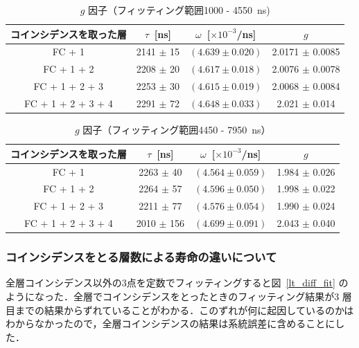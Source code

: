 \begin{table}[H]
\caption{$g$ 因子（フィッティング範囲1000 - 4550~ns) }
\label{fitrange3}
\centering
\begin{tabular}{cccc}\toprule
コインシデンスを取った層 & $\tau$~[ns] & $\omega$~[$\times 10^{-3}$/ns] & $g$ \\ \midrule
FC + 1             & 2141 $\pm$ 15 & $(4.639 \pm 0.020) $ & 2.0171 $\pm$ 0.0085 \\
 FC + 1 + 2        & 2208 $\pm$ 20 & $(4.617 \pm 0.018) $ & 2.0076 $\pm$ 0.0078 \\
FC + 1 + 2 + 3     & 2253 $\pm$ 30 & $(4.615 \pm 0.019) $ & 2.0068 $\pm$ 0.0084 \\
FC + 1 + 2 + 3 + 4 & 2291 $\pm$ 72 & $(4.648 \pm 0.033) $ & 2.021  $\pm$ 0.014 \\ \bottomrule
\end{tabular}
\end{table}%

\begin{table}[H]
\caption{$g$ 因子（フィッティング範囲4450 - 7950~ns） }
\label{fitrange4}
\centering
\begin{tabular}{cccc}\toprule
コインシデンスを取った層 & $\tau$~[ns] & $\omega$~[$\times 10^{-3}$/ns] & $g$ \\ \midrule
FC + 1             & 2263 $\pm$ 40 & $(4.564 \pm 0.059) $ & 1.984 $\pm$ 0.026 \\
FC + 1 + 2         & 2264 $\pm$ 57 & $(4.596 \pm 0.050) $ & 1.998 $\pm$ 0.022 \\
FC + 1 + 2 + 3     & 2211 $\pm$ 77 & $(4.576 \pm 0.054) $ & 1.990 $\pm$ 0.024\\
FC + 1 + 2 + 3 + 4 & 2010 $\pm$ 156& $(4.699 \pm 0.091) $ & 2.043 $\pm$ 0.040 \\ \bottomrule
\end{tabular}
\end{table}%

\subsubsection{コインシデンスをとる層数による寿命の違いについて}
全層コインシデンス以外の3点を定数でフィッティングすると図~\ref{lt_diff_fit} のようになった．全層でコインシデンスをとったときのフィッティング結果が3 層目までの結果からずれていることがわかる．このずれが何に起因しているのかはわからなかったので，全層コインシデンスの結果は系統誤差に含めることにした．

